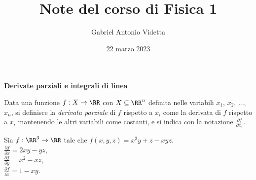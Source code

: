 \documentclass[11pt]{article}
\title{\textbf{Note del corso di Fisica 1}}
\author{Gabriel Antonio Videtta}
\date{22 marzo 2023}
\begin{document}
	
	\maketitle
	
	\begin{center}
		\Large \textbf{Derivate parziali e integrali di linea}
	\end{center}

	\begin{definition}
		Data una funzione $f : X \to \RR$ con $X \subseteq \RR^n$ definita nelle variabili $x_1$, $x_2$, ..., $x_n$, si
		definisce la \textit{derivata parziale} di $f$ rispetto a $x_i$ come la derivata di $f$ rispetto a $x_i$
		mantenendo le altri variabili come costanti, e si indica con la notazione $\frac{\partial f}{\partial x_i}$.
	\end{definition}

	\begin{example}
		Sia $f : \RR^3 \to \RR$ tale che $f(x, y, z) = x^2y + z - xyz$. \\
		
		\li $\frac{\partial f}{\partial x} = 2xy - yz$, \\ \vskip 0.01in
		\li $\frac{\partial f}{\partial y} = x^2 - xz$, \\ \vskip 0.015in
		\li $\frac{\partial f}{\partial z} = 1-xy$.
	\end{example}
	
\end{document}

